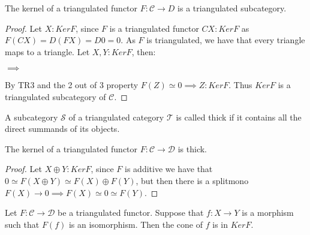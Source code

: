     \begin{lemma}
        The kernel of a triangulated functor $F:\mathcal{C}\rightarrow{D}$ is a triangulated subcategory.
    \end{lemma}

    \begin{proof}
        Let $X:KerF$, since $F$ is a triangulated functor $CX:KerF$ as $F(CX)=D(FX)=D0=0$. As $F$ is triangulated, we have that every triangle maps to a triangle. Let $X,Y:KerF$, then:
        \begin{center}
            $\implies$
        \end{center}
        By TR3 and the 2 out of 3 property $F(Z)\simeq 0 \implies Z:KerF$. Thus $KerF$ is a triangulated subcategory of $\mathcal{C}$.
    \end{proof}

    \begin{definition}
        A subcategory $\mathcal{S}$ of a triangulated category $\mathcal{T}$ is called thick if it contains all the direct summands of its objects.
    \end{definition}

    \begin{lemma}
        The kernel of a triangulated functor $F:\mathcal{C}\rightarrow\mathcal{D}$ is thick.
    \end{lemma}

    \begin{proof}
        Let $X\oplus Y:KerF$, since $F$ is additive we have that $0\simeq F(X\oplus Y)\simeq F(X)\oplus F(Y)$, but then there is a splitmono $F(X)\rightarrow 0 \implies F(X)\simeq 0 \simeq F(Y)$.
    \end{proof}

    \begin{lemma}
        Let $F:\mathcal{C}\rightarrow\mathcal{D}$ be a triangulated functor. Suppose that $f:X\rightarrow Y$ is a morphism such that $F(f)$ is an isomorphism. Then the cone of $f$ is in $KerF$.
    \end{lemma}

